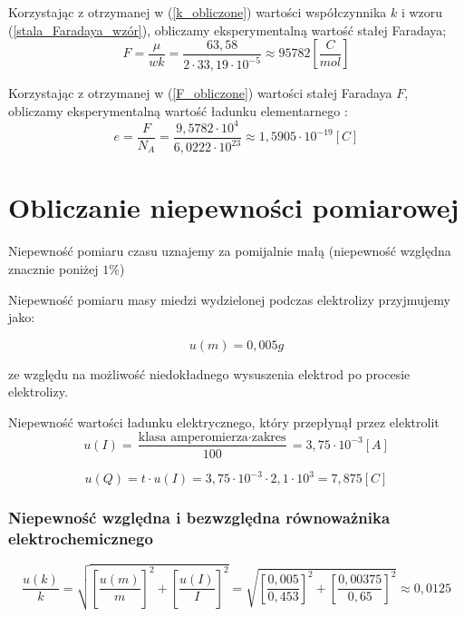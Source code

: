 \documentclass [a4paper,11pt]{article}
\begin{document}
Korzystając z otrzymanej w (\ref{k_obliczone})  wartości współczynnika  $k$ i  wzoru (\ref{stala_Faradaya_wzór}),
obliczamy eksperymentalną wartość stałej Faradaya;
\begin{equation}
F = \frac{\mu}{w k} = \frac{63,58 }{2 \cdot 33,19 \cdot 10^{-5}} \approx 95782   \left[  \frac{C}{mol}\right] 
\label{F_obliczone} 
\end{equation}

Korzystając z otrzymanej w (\ref{F_obliczone})  wartości stałej Faradaya  $F$, obliczamy eksperymentalną wartość ładunku elementarnego :
\begin{equation}
e = \frac{F}{N_A} = \frac{9,5782 \cdot 10^4}{6,0222 \cdot 10^{23}} \approx 1,5905 \cdot 10^{-19}   \left[  C \right] 
\label{e_obliczone} 
\end{equation}

\section{Obliczanie niepewności pomiarowej}
Niepewność pomiaru czasu uznajemy za pomijalnie małą (niepewność względna znacznie poniżej $ 1 \% $)
 
Niepewność pomiaru masy miedzi wydzielonej podczas elektrolizy przyjmujemy jako:

\begin{equation*}
u(m) = 0,005 g
\end{equation*}

ze względu na możliwość niedokładnego wysuszenia elektrod po procesie elektrolizy.


Niepewność wartości ładunku elektrycznego, który przepłynął przez elektrolit
\begin{equation*}
u(I) = \frac{\text{klasa amperomierza} \cdot \text{zakres}}{100} = 3,75 \cdot 10^{-3} [A]
\end{equation*}

\begin{equation*}
u(Q) = t \cdot u(I) = 3,75 \cdot 10^{-3} \cdot 2,1 \cdot 10^3 = 7,875 [C]
\end{equation*}

\subsubsection*{Niepewność względna i bezwzględna  równoważnika elektrochemicznego}  

\begin{equation*}
\frac{u(k)}{k} = \sqrt{\left[\frac{u(m)}{m} \right]^2 + \left[\frac{u(I)}{I} \right]^2 } = \sqrt{\left[\frac{ 0,005}{0,453} \right]^2 + \left[\frac{0,00375}{0,65} \right]^2 } \approx 0,0125
\end{equation*}
\end{document}
